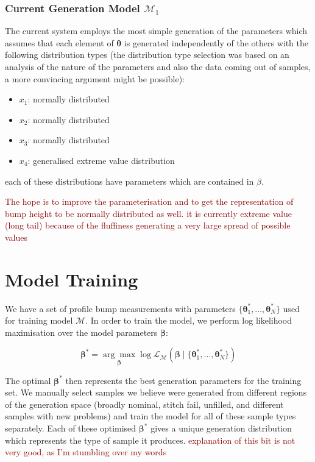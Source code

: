 \documentclass[12pt]{report}
\newcommand{\tcr}[1]{\textcolor{darkRed}{#1}}
\begin{document}
        \subsubsection{Current Generation Model $\mathcal{M}_1$}
            The current system employs the most simple generation of the parameters which assumes that each element of $\pmb{\theta}$ is generated independently of the others with the following distribution types (the distribution type selection was based on an analysis of the nature of the parameters and also the data coming out of samples, a more convincing argument might be possible):
            \begin{itemize}
                \item $x_1$: normally distributed
                \item $x_2$: normally distributed
                \item $x_3$: normally distributed
                \item $x_4$: generalised extreme value distribution
            \end{itemize}
            each of these distributions have parameters which are contained in $\beta$.
            
            \tcr{The hope is to improve the parameterisation and to get the representation of bump height to be normally distributed as well. it is currently extreme value (long tail) because of the fluffiness generating a very large spread of possible values}
        
    \section{Model Training}
        We have a set of profile bump measurements with parameters $\{\pmb{\theta}^*_1,\ldots,\pmb{\theta}^*_N\}$ used for training model $\mathcal{M}$. In order to train the model, we perform log likelihood maximisation over the model parameters $\pmb{\beta}$:
        
        \[
            \pmb{\beta}^* = \underset{\pmb{\beta}}{\arg\max}\log\mathcal{L}_\mathcal{M}(\pmb{\beta}\mid \{\pmb{\theta}^*_1,\ldots,\pmb{\theta}^*_N\})
        \]
        
        The optimal $\pmb{\beta}^*$ then represents the best generation parameters for the training set. We manually select samples we believe were generated from different regions of the generation space (broadly nominal, stitch fail, unfilled, and different samples with new problems) and train the model for all of these sample types separately. Each of these optimised $\pmb{\beta}^*$ gives a unique generation distribution which represents the type of sample it produces. 
        \tcr{explanation of this bit is not very good, as I'm stumbling over my words}
    
\end{document}
